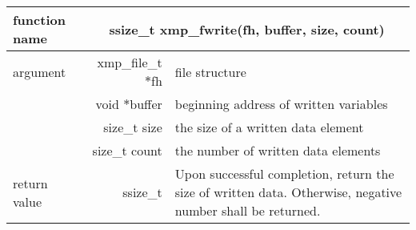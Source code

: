    \begin{table}[h]
    \begin{center}
     \begin{tabular}{|l|r|p{80mm}|}
      \hline
      {\bf function name}  & \multicolumn{2}{c|}{\bf ssize\_t
      xmp\_fwrite(fh, buffer, size, count)} \\ \hline \hline
      argument & xmp\_file\_t $*$fh & file structure \\ \cline{2-3}
      & void $*$buffer & beginning address of written variables \\ \cline{2-3}
      & size\_t size & the size of a written data element \\ \cline{2-3}
      & size\_t count & the number of written data elements \\ \hline
      return value & ssize\_t & Upon successful completion, return the size
	      of written data. Otherwise, negative number shall be
	      returned. \\ \hline
      \end{tabular}
     \end{center}
   \end{table}

   
